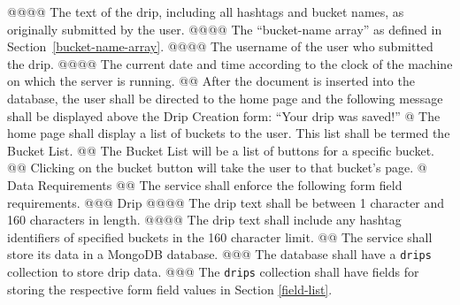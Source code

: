 \documentclass{article}
\begin{document}
\begin{easylist}[articletoc]
@@@@ The text of the drip, including all hashtags and bucket names, as originally submitted by the user.
@@@@ The ``bucket-name array'' as defined in Section~\ref{bucket-name-array}.
@@@@ The username of the user who submitted the drip.
@@@@ The current date and time according to the clock of the machine on which the server is running.
@@ After the document is inserted into the database, the user shall be directed to the home page and the following message shall be displayed above the Drip Creation form: ``Your drip was saved!''
@ The home page shall display a list of buckets to the user. This list shall be termed the Bucket List.
@@ The Bucket List will be a list of buttons for a specific bucket.
@@ Clicking on the bucket button will take the user to that bucket’s page.
@ Data Requirements
@@ The service shall enforce the following form field requirements.
@@@ Drip
@@@@ The drip text shall be between 1 character and 160 characters in length.
@@@@ The drip text shall include any hashtag identifiers of specified buckets in the 160 character limit.
@@ The service shall store its data in a MongoDB database.
@@@ The database shall have a \texttt{drips} collection to store drip data.
@@@ The \texttt{drips} collection shall have fields for storing the respective form field values in Section \ref{field-list}.

\end{easylist}
\end{document}
